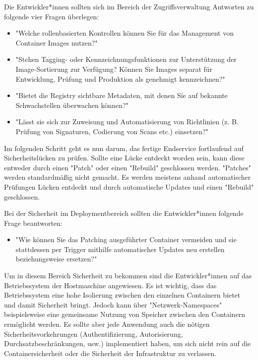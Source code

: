 Die Entwickler*innen sollten sich im Bereich der Zugriffsverwaltung Antworten zu folgende vier Fragen überlegen:

\begin{itemize}
    \item "Welche rollenbasierten Kontrollen können Sie für das Management von Container Images nutzen?" \cite{ContainerSecurity}
    \item "Stehen Tagging- oder Kennzeichnungsfunktionen zur Unterstützung der Image-Sortierung zur Verfügung? Können Sie Images separat für Entwicklung, Prüfung und Produktion als genehmigt kennzeichnen?" \cite{ContainerSecurity}
    \item "Bietet die Registry sichtbare Metadaten, mit denen Sie auf bekannte Schwachstellen überwachen können?" \cite{ContainerSecurity}
    \item "Lässt sie sich zur Zuweisung und Automatisierung von Richtlinien (z. B. Prüfung von Signaturen, Codierung von Scans etc.) einsetzen?" \cite{ContainerSecurity}
\end{itemize}


Im folgenden Schritt geht es nun darum, das fertige Endservice fortlaufend auf Sicherheitslücken zu prüfen. Sollte eine Lücke entdeckt worden sein, kann diese entweder durch einen "Patch" oder einen "Rebuild" geschlossen werden. "Patches" werden standardmäßig nicht gemacht. Es werden meistens anhand automatischer Prüfungen Lücken entdeckt und durch automatische Updates und einen "Rebuild" geschlossen. \cite{ContainerSecurity}

Bei der Sicherheit im Deploymentbereich sollten die Entwickler*innen folgende Frage beantworten:

\begin{itemize}
    \item "Wie können Sie das Patching ausgeführter Container vermeiden und sie stattdessen per Trigger mithilfe automatischer Updates neu erstellen beziehungsweise ersetzen?" \cite{ContainerSecurity}
\end{itemize}




Um in diesem Bereich Sicherheit zu bekommen sind die Entwickler*innen auf das Betriebssystem der Hostmaschine angewiesen. Es ist wichtig, dass das Betriebssystem eine hohe Isolierung zwischen den einzelnen Containern bietet und damit Sicherheit bringt. Jedoch kann über "Netzwerk-Namespaces" beispielsweise eine gemeinsame Nutzung von Speicher zwischen den Containern ermöglicht werden. Es sollte aber jede Anwendung auch die nötigen Sicherheitsvorkehrungen (Authentifizierung, Autorisierung, Durchsatzbeschränkungen, usw.) implementiert haben, um sich nicht rein auf die Containersicherheit oder die Sicherheit der Infrastruktur zu verlassen. \cite{ContainerSecurity}

